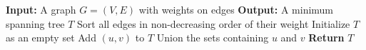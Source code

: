 \documentclass[12pt]{book} %
\begin{document}
\begin{algorithm}
\caption{Kruskal's Algorithm For Minimum Spanning Tree}
\begin{algorithmic}
\State \textbf{Input:} A graph $G = (V, E)$ with weights on edges
\State \textbf{Output:} A minimum spanning tree $T$
\State Sort all edges in non-decreasing order of their weight
\State Initialize $T$ as an empty set
        \State Add $(u, v)$ to $T$
        \State Union the sets containing $u$ and $v$
    \EndIf
\EndFor
\State \textbf{Return} $T$
\end{algorithmic}
\end{algorithm}
\end{document}
